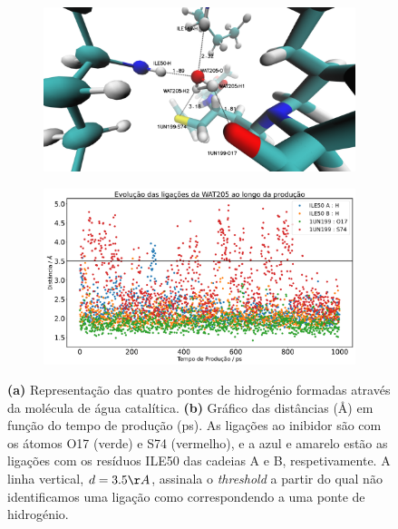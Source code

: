 \documentclass[12pt,a4paper]{article}
\begin{document}
	\begin{figure}[h]
	\begin{subfigure}[b]{0.48\textwidth}
		\centering
		\includegraphics[width=\textwidth]{images/wat205.pdf}
		\caption{}
		\label{fig:an:wat205-vmd}
	\end{subfigure}
	\begin{subfigure}[b]{0.48\textwidth}
		\centering
		\includegraphics[width=\textwidth]{images/plots-205water.pdf}
		\caption{}
		\label{fig:an:wat205-plot}
	\end{subfigure}
	\caption{\textbf{(a)} Representação das quatro pontes de hidrogénio formadas através da molécula de água catalítica. \textbf{(b)} Gráfico das distâncias (\AA) em função do tempo de produção (ps). As ligações ao inibidor são com os átomos O17 (verde) e S74 (vermelho), e a azul e amarelo estão as ligações com os resíduos ILE50 das cadeias A e B, respetivamente. A linha vertical, $d= 3.5\AA$, assinala o \textit{threshold} a partir do qual não identificamos uma ligação como correspondendo a uma ponte de hidrogénio.}
	\label{fig:an:vars-estruturais}
 	\end{figure}
 
\end{document}
